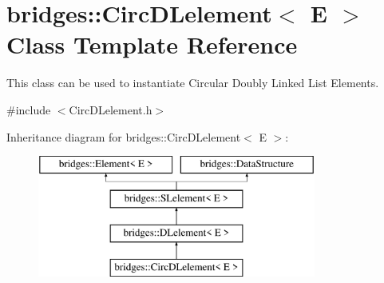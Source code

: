 \hypertarget{classbridges_1_1_circ_d_lelement}{}\section{bridges\+:\+:Circ\+D\+Lelement$<$ E $>$ Class Template Reference}
\label{classbridges_1_1_circ_d_lelement}


This class can be used to instantiate Circular Doubly Linked List Elements.  




{\ttfamily \#include $<$Circ\+D\+Lelement.\+h$>$}

Inheritance diagram for bridges\+:\+:Circ\+D\+Lelement$<$ E $>$\+:\begin{figure}[H]
\begin{center}
\leavevmode
\includegraphics[height=4.000000cm]{classbridges_1_1_circ_d_lelement}
\end{center}
\end{figure}

